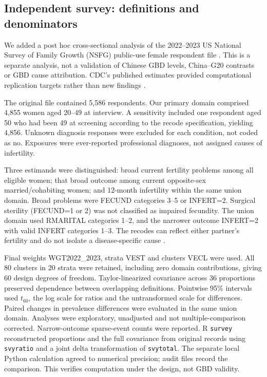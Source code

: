 \subsection{Independent survey: definitions and denominators}
We added a post hoc cross-sectional analysis of the 2022--2023 US National Survey of Family Growth (NSFG) public-use female respondent file \cite{nsfgdata}. This is a separate analysis, not a validation of Chinese GBD levels, China--G20 contrasts or GBD cause attribution. CDC's published estimates provided computational replication targets rather than new findings \cite{nugent2026}.

The original file contained 5,586 respondents. Our primary domain comprised 4,855 women aged 20--49 at interview. A sensitivity included one respondent aged 50 who had been 49 at screening according to the recode specification, yielding 4,856. Unknown diagnosis responses were excluded for each condition, not coded as no. Exposures were ever-reported professional diagnoses, not assigned causes of infertility.

Three estimands were distinguished: broad current fertility problems among all eligible women; that broad outcome among current opposite-sex married/cohabiting women; and 12-month infertility within the same union domain. Broad problems were FECUND categories 3--5 or INFERT=2. Surgical sterility (FECUND=1 or 2) was not classified as impaired fecundity. The union domain used RMARITAL categories 1--2, and the narrower outcome INFERT=2 with valid INFERT categories 1--3. The recodes can reflect either partner's fertility and do not isolate a disease-specific cause \cite{nugent2024,nsfgrecodes}.

Final weights WGT2022\_2023, strata VEST and clusters VECL were used. All 80 clusters in 20 strata were retained, including zero domain contributions, giving 60 design degrees of freedom. Taylor-linearized covariance across 36 proportions preserved dependence between overlapping definitions. Pointwise 95\% intervals used $t_{60}$, the log scale for ratios and the untransformed scale for differences. Paired changes in prevalence differences were evaluated in the same union domain. Analyses were exploratory, unadjusted and not multiple-comparison corrected. Narrow-outcome sparse-event counts were reported. R \texttt{survey} reconstructed proportions and the full covariance from original records using \texttt{svyratio} and a joint delta transformation of \texttt{svytotal}. The separate local Python calculation agreed to numerical precision; audit files record the comparison. This verifies computation under the design, not GBD validity.
